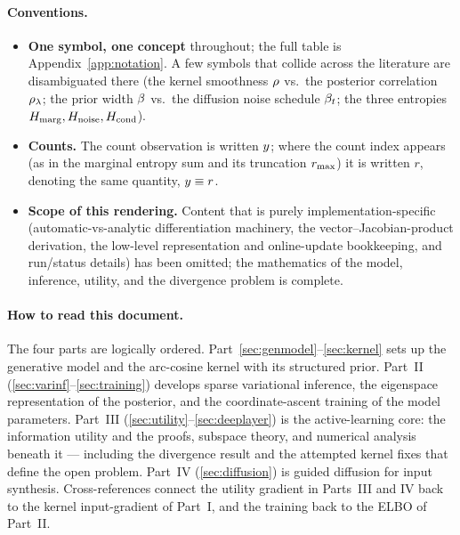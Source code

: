 \paragraph{Conventions.}
\begin{itemize}[leftmargin=1.4em,itemsep=1pt,topsep=2pt]
  \item \textbf{One symbol, one concept} throughout; the full table is
        Appendix~\ref{app:notation}. A few symbols that collide across the
        literature are disambiguated there (the kernel smoothness $\rho$ vs.\ the
        posterior correlation $\rho_{\lambda}$; the prior width $\beta$ vs.\ the diffusion
        noise schedule $\beta_{t}$; the three entropies $H_{\mathrm{marg}},H_{\mathrm{noise}},H_{\mathrm{cond}}$).
  \item \textbf{Counts.} The count observation is written $y$; where the count
        index appears (as in the marginal entropy sum and its truncation
        $r_{\max}$) it is written $r$, denoting the same quantity, $y\equiv r$.
  \item \textbf{Scope of this rendering.} Content that is purely
        implementation-specific (automatic-vs-analytic differentiation machinery,
        the vector--Jacobian-product derivation, the low-level representation and
        online-update bookkeeping, and run/status details) has been omitted; the
        mathematics of the model, inference, utility, and the divergence problem is
        complete.
\end{itemize}

\paragraph{How to read this document.} The four parts are logically ordered.
Part~\ref{sec:genmodel}--\ref{sec:kernel} sets up the generative model and the
arc-cosine kernel with its structured prior. Part~II
(\ref{sec:varinf}--\ref{sec:training}) develops sparse variational inference, the
eigenspace representation of the posterior, and the coordinate-ascent training of
the model parameters. Part~III (\ref{sec:utility}--\ref{sec:deeplayer}) is the
active-learning core: the information utility and the proofs, subspace theory, and
numerical analysis beneath it --- including the divergence result and the attempted
kernel fixes that define the open problem. Part~IV (\ref{sec:diffusion}) is guided
diffusion for input synthesis. Cross-references connect the utility gradient in
Parts~III and IV back to the kernel input-gradient of Part~I, and the training
back to the ELBO of Part~II.
